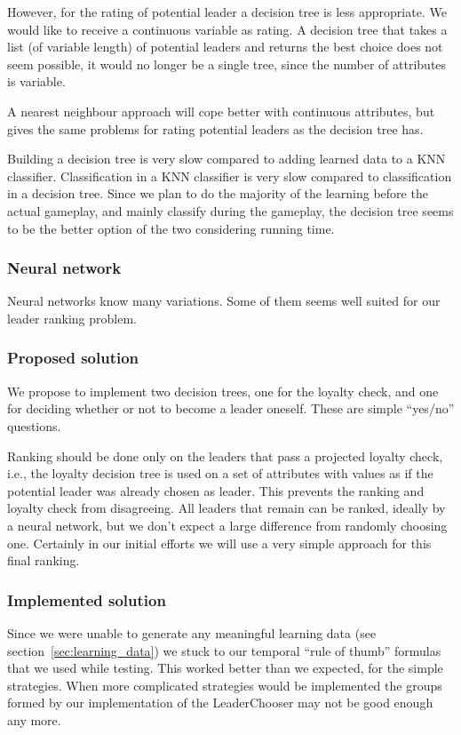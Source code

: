 However, for the rating of potential leader a decision tree is less appropriate. We would like to receive a continuous variable as rating. A decision tree that takes a list (of variable length) of potential leaders and returns the best choice does not seem possible, it would no longer be a single tree, since the number of attributes is variable.

A nearest neighbour approach will cope better with continuous attributes, but gives the same problems for rating potential leaders as the decision tree has.

Building a decision tree is very slow compared to adding learned data to a KNN classifier. Classification in a KNN classifier is very slow compared to classification in a decision tree. Since we plan to do the majority of the learning before the actual gameplay, and mainly classify during the gameplay, the decision tree seems to be the better option of the two considering running time.

\subsubsection{Neural network}
Neural networks know many variations. Some of them seems well suited for our leader ranking problem.

\subsubsection{Proposed solution}
We propose to implement two decision trees, one for the loyalty check, and one for deciding whether or not to become a leader oneself. These are simple ``yes/no'' questions.

Ranking should be done only on the leaders that pass a projected loyalty check, i.e., the loyalty decision tree is used on a set of attributes with values as if the potential leader was already chosen as leader. This prevents the ranking and loyalty check from disagreeing. All leaders that remain can be ranked, ideally by a neural network, but we don't expect a large difference from randomly choosing one. Certainly in our initial efforts we will use a very simple approach for this final ranking.

\subsubsection{Implemented solution}
Since we were unable to generate any meaningful learning data (see section~\ref{sec:learning_data}) we stuck to our temporal ``rule of thumb'' formulas that we used while testing. This worked better than we expected, for the simple strategies. When more complicated strategies would be implemented the groups formed by our implementation of the LeaderChooser may not be good enough any more.

